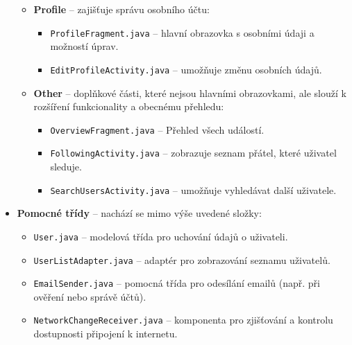 \begin{itemize}
\begin{itemize}
    \item \textbf{Profile} – zajišťuje správu osobního účtu:
    \begin{itemize}
      \item \texttt{ProfileFragment.java} – hlavní obrazovka s osobními údaji a možností úprav.
      \item \texttt{EditProfileActivity.java} – umožňuje změnu osobních údajů.
    \end{itemize}

    \item \textbf{Other} – doplňkové části, které nejsou hlavními obrazovkami, ale slouží k rozšíření funkcionality a obecnému přehledu:
    \begin{itemize}
      \item \texttt{OverviewFragment.java} – Přehled všech událostí.
      \item \texttt{FollowingActivity.java} – zobrazuje seznam přátel, které uživatel sleduje.
      \item \texttt{SearchUsersActivity.java} – umožňuje vyhledávat další uživatele.
    \end{itemize}

  \end{itemize}

  \item \textbf{Pomocné třídy} – nachází se mimo výše uvedené složky:
  \begin{itemize}
    \item \texttt{User.java} – modelová třída pro uchování údajů o uživateli.
    \item \texttt{UserListAdapter.java} – adaptér pro zobrazování seznamu uživatelů.
    \item \texttt{EmailSender.java} – pomocná třída pro odesílání emailů (např. při ověření nebo správě účtů).
    \item \texttt{NetworkChangeReceiver.java} – komponenta pro zjišťování a kontrolu dostupnosti připojení k internetu.
  \end{itemize}
\end{itemize}




